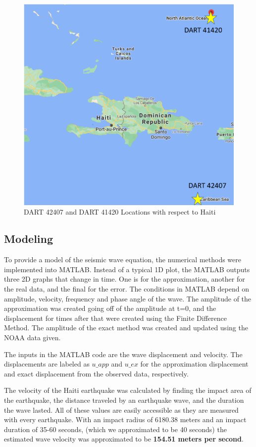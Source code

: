 \documentclass[conf]{new-aiaa}
\begin{document}
\begin{figure}[H]
    \begin{center}
    \includegraphics[width =.7\linewidth]{figures/ground stations.png}
    \caption{DART 42407 and DART 41420 Locations with respect to Haiti}
    \label{fig_dartlocation}
    \end{center}
\end{figure}

\subsection{Modeling}
To provide a model of the seismic wave equation, the numerical methods were implemented into MATLAB. Instead of a typical 1D plot, the MATLAB outputs three 2D graphs that change in time. One is for the approximation, another for the real data, and the final for the error. The conditions in MATLAB depend on amplitude, velocity, frequency and phase angle of the wave. The amplitude of the approximation was created going off of the amplitude at t=0, and the displacement for times after that were created using the Finite Difference Method. The amplitude of the exact method was created and updated using the NOAA data given. 

The inputs in the MATLAB code are the wave displacement and velocity. The displacements are labeled as $u\_app$ and $u\_ex$ for the approximation displacement and exact displacement from the observed data, respectively. 

The velocity of the Haiti earthquake was calculated by finding the impact area of the earthquake, the distance traveled by an earthquake wave, and the duration the wave lasted. All of these values are easily accessible as they are measured with every earthquake. With an impact radius of 6180.38 meters and an impact duration of 35-60 seconds, (which we approximated to be 40 seconds) the estimated wave velocity was approximated to be \textbf{154.51 meters per second}. 
\end{document}
